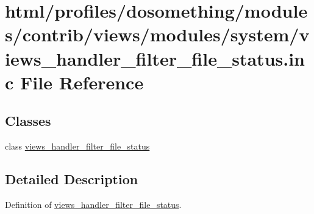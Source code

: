 \hypertarget{views__handler__filter__file__status_8inc}{
\section{html/profiles/dosomething/modules/contrib/views/modules/system/views\_\-handler\_\-filter\_\-file\_\-status.inc File Reference}
\label{views__handler__filter__file__status_8inc}
}
\subsection*{Classes}
\begin{DoxyCompactItemize}
\item 
class \hyperlink{classviews__handler__filter__file__status}{views\_\-handler\_\-filter\_\-file\_\-status}
\end{DoxyCompactItemize}


\subsection{Detailed Description}
Definition of \hyperlink{classviews__handler__filter__file__status}{views\_\-handler\_\-filter\_\-file\_\-status}. 